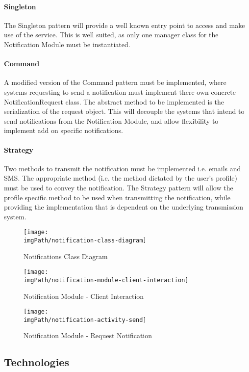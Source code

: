 \paragraph{Singleton}
The Singleton pattern will provide a well known entry point to access and make use of the service. This is well suited, as only one manager class for the Notification Module must be instantiated. 

\paragraph{Command}
A modified version of the Command pattern must be implemented, where systems requesting to send a notification must implement there own concrete NotificationRequest class. The abstract method to be implemented is the serialization of the request object. This will decouple the systems that intend to send notifications from the Notification Module, and allow flexibility to implement add on specific notifications.

\paragraph{Strategy}
Two methods to transmit the notification must be implemented i.e. emails and SMS. The appropriate method (i.e. the method dictated by the user's profile) must be used to convey the notification. The Strategy pattern will allow the profile specific method to be used when transmitting the notification, while providing the implementation that is dependent on the underlying transmission system.

\begin{figure}[H]
\centering
\texttt{[image: \\imgPath/notification-class-diagram]}
\caption{Notifications Class Diagram}
\end{figure}

\begin{figure}[H]
\centering
\texttt{[image: \\imgPath/notification-module-client-interaction]}
\caption{Notification Module - Client Interaction}
\end{figure}

\begin{figure}[H]
\centering
\texttt{[image: \\imgPath/notification-activity-send]}
\caption{Notification Module - Request Notification}
\end{figure}


\subsection{Technologies}

